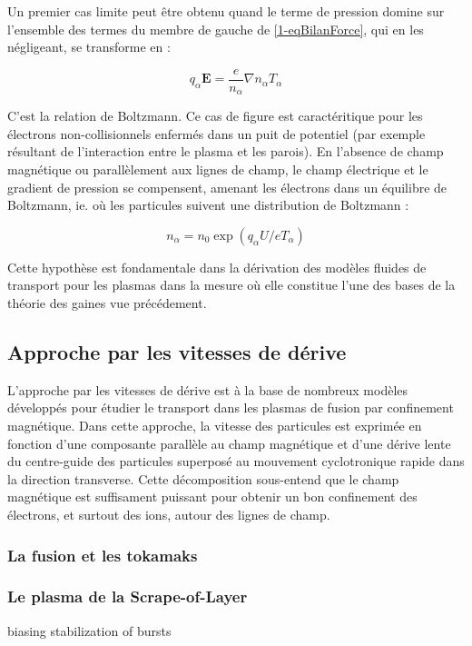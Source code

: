 \begin{refsection}
Un premier cas limite peut être obtenu quand le terme de pression domine
sur l'ensemble des termes du membre de gauche de \eqref{1-eqBilanForce}, qui en
les négligeant, se transforme en :

\begin{equation}
\label{1-equilibreBoltzman}
q_\alpha\mathbf
E =\frac{e}{n_\alpha}\nabla n_\alpha T_\alpha
\end{equation}

C'est la relation de Boltzmann. Ce cas de figure est caractéritique pour les
électrons non-collisionnels enfermés dans un puit de potentiel (par exemple résultant de
l'interaction entre le plasma et les parois). En l'absence de champ magnétique
ou parallèlement aux lignes de champ, le champ électrique et le gradient de
pression se compensent, amenant les électrons dans un équilibre de Boltzmann,
ie. où les particules suivent une distribution de Boltzmann :

\begin{equation}
\label{1-profilBoltzman}
n_\alpha=n_0\exp(q_\alpha U/eT_\alpha)
\end{equation}

Cette hypothèse est fondamentale dans la dérivation des modèles fluides de
transport pour les plasmas dans la mesure où elle constitue l'une des bases de
la théorie des gaines vue précédement. 

\subsection{Approche par les vitesses de dérive}

L'approche par les vitesses de dérive est à la base de nombreux modèles
développés pour étudier le transport dans les plasmas de fusion par
confinement magnétique. Dans cette approche, la vitesse des particules
est exprimée en fonction d'une composante parallèle au champ magnétique et d'une dérive lente du
centre-guide des particules superposé au mouvement cyclotronique rapide dans
la direction transverse. Cette décomposition sous-entend que le champ
magnétique est suffisament puissant pour obtenir un bon confinement des
électrons, et surtout des ions, autour des lignes de champ. 


\subsubsection{La fusion et les tokamaks}
\parencite{Wesson}
\subsubsection{Le plasma de la Scrape-of-Layer}
\parencite{Ghendrih}biasing stabilization of bursts

\end{refsection}

